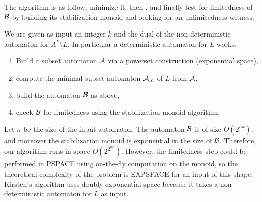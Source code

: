 The algorithm is as follow, minimize it, then , and finally test for limitedness of $\mathcal B$ by building its stabilization monoid and looking for an unlimitedness witness.
\begin{framed}
We are given as input an integer $k$ and the dual of the non-deterministic automaton for $A^*\setminus L$. In particular a deterministic automaton for $L$ works.
\begin{enumerate}
	\item Build a subset automaton $\mathcal{A}$ via a powerset construction (exponential space),
	\item compute the minimal subset automaton $\mathcal{A}_m$ of $L$ from $\mathcal{A}$,
	\item build the automaton $\mathcal B$ as above,
	\item check $\mathcal B$ for limitedness using the stabilization monoid algorithm.
\end{enumerate}
\end{framed}

Let $n$ be the size of the input automaton.
The automaton $\mathcal B$ is of size $O(2^{nk})$, and moreover the stabilization monoid is exponential in the size of $\mathcal B$.
Therefore, our algorithm runs in space $O(2^{2^{nk}})$. However, the limitedness step could be performed in PSPACE using on-the-fly computation on the monoid, so the theoretical complexity of the problem is EXPSPACE for an input of this shape. Kirsten's algorithm uses doubly exponential space because it takes a non-deterministic automaton for $L$ as input.
